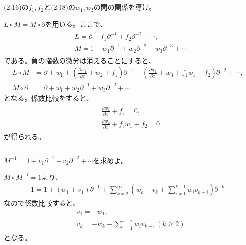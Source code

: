\documentclass{jsarticle}
\begin{document}
\subsection{}
\begin{shaded}
(2.16)の$f_{1},f_{2}$と(2.18)の$w_{1},w_{2}$の間の関係を導け。
\end{shaded}
$L\circ M=M\circ\partial$を用いる。ここで、
\begin{align}
\begin{aligned}
&L=\partial+f_{1}\partial^{-1}+f_{2}\partial^{-2}+\cdots,\\
&M=1+w_{1}\partial^{-1}+w_{2}\partial^{-2}+w_{3}\partial^{-3}+\cdots
\end{aligned}
\end{align}
である。負の階数の微分は消えることにすると、
\begin{align*}
L\circ M&=\partial+w_{1}+\left(\frac{\partial w_{1}}{\partial x}+w_{2}+f_{1}\right)\partial^{-1}+\left(\frac{\partial w_{2}}{\partial x}+w_{3}+f_{1}w_{1}+f_{2}\right)\partial^{-2}+\cdots,\\
M\circ\partial&=\partial+w_{1}+w_{2}\partial^{-1}+w_{3}\partial^{-2}+\cdots
\end{align*}
となる。係数比較をすると、
\begin{align}
\begin{aligned}
&\frac{\partial w_{1}}{\partial x}+f_{1}=0,\\
&\frac{\partial w_{2}}{\partial x}+f_{1}w_{1}+f_{2}=0
\end{aligned}
\end{align}
が得られる。

\subsection{}
\begin{shaded}
$M^{-1}=1+v_{1}\partial^{-1}+v_{2}\partial^{-2}+\cdots$を求めよ。
\end{shaded}
$M\circ M^{-1}=1$より、
\begin{align*}
1=1+(w_{1}+v_{1})\partial^{-1}+\sum_{k=2}^{\infty}\left(w_{k}+v_{k}+\sum_{i=1}^{k-1}w_{i}v_{k-i}\right)\partial^{-k}
\end{align*}
なので係数比較すると、
\begin{align}
\begin{aligned}
&v_{1}=-w_{1},\\
&v_{k}=-w_{k}-\sum_{i=1}^{k-i}w_{i}v_{k-i}\ (k\ge2)
\end{aligned}
\end{align}
となる。
\end{document}
